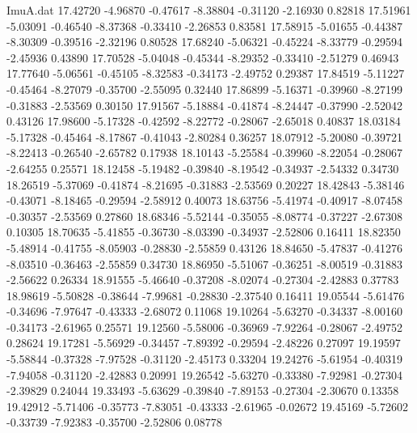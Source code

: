 \begin{filecontents}{ImuA.dat}
  17.42720   -4.96870   -0.47617   -8.38804   -0.31120   -2.16930    0.82818
  17.51961   -5.03091   -0.46540   -8.37368   -0.33410   -2.26853    0.83581
  17.58915   -5.01655   -0.44387   -8.30309   -0.39516   -2.32196    0.80528
  17.68240   -5.06321   -0.45224   -8.33779   -0.29594   -2.45936    0.43890
  17.70528   -5.04048   -0.45344   -8.29352   -0.33410   -2.51279    0.46943
  17.77640   -5.06561   -0.45105   -8.32583   -0.34173   -2.49752    0.29387
  17.84519   -5.11227   -0.45464   -8.27079   -0.35700   -2.55095    0.32440
  17.86899   -5.16371   -0.39960   -8.27199   -0.31883   -2.53569    0.30150
  17.91567   -5.18884   -0.41874   -8.24447   -0.37990   -2.52042    0.43126
  17.98600   -5.17328   -0.42592   -8.22772   -0.28067   -2.65018    0.40837
  18.03184   -5.17328   -0.45464   -8.17867   -0.41043   -2.80284    0.36257
  18.07912   -5.20080   -0.39721   -8.22413   -0.26540   -2.65782    0.17938
  18.10143   -5.25584   -0.39960   -8.22054   -0.28067   -2.64255    0.25571
  18.12458   -5.19482   -0.39840   -8.19542   -0.34937   -2.54332    0.34730
  18.26519   -5.37069   -0.41874   -8.21695   -0.31883   -2.53569    0.20227
  18.42843   -5.38146   -0.43071   -8.18465   -0.29594   -2.58912    0.40073
  18.63756   -5.41974   -0.40917   -8.07458   -0.30357   -2.53569    0.27860
  18.68346   -5.52144   -0.35055   -8.08774   -0.37227   -2.67308    0.10305
  18.70635   -5.41855   -0.36730   -8.03390   -0.34937   -2.52806    0.16411
  18.82350   -5.48914   -0.41755   -8.05903   -0.28830   -2.55859    0.43126
  18.84650   -5.47837   -0.41276   -8.03510   -0.36463   -2.55859    0.34730
  18.86950   -5.51067   -0.36251   -8.00519   -0.31883   -2.56622    0.26334
  18.91555   -5.46640   -0.37208   -8.02074   -0.27304   -2.42883    0.37783
  18.98619   -5.50828   -0.38644   -7.99681   -0.28830   -2.37540    0.16411
  19.05544   -5.61476   -0.34696   -7.97647   -0.43333   -2.68072    0.11068
  19.10264   -5.63270   -0.34337   -8.00160   -0.34173   -2.61965    0.25571
  19.12560   -5.58006   -0.36969   -7.92264   -0.28067   -2.49752    0.28624
  19.17281   -5.56929   -0.34457   -7.89392   -0.29594   -2.48226    0.27097
  19.19597   -5.58844   -0.37328   -7.97528   -0.31120   -2.45173    0.33204
  19.24276   -5.61954   -0.40319   -7.94058   -0.31120   -2.42883    0.20991
  19.26542   -5.63270   -0.33380   -7.92981   -0.27304   -2.39829    0.24044
  19.33493   -5.63629   -0.39840   -7.89153   -0.27304   -2.30670    0.13358
  19.42912   -5.71406   -0.35773   -7.83051   -0.43333   -2.61965   -0.02672
  19.45169   -5.72602   -0.33739   -7.92383   -0.35700   -2.52806    0.08778

\end{filecontents}
